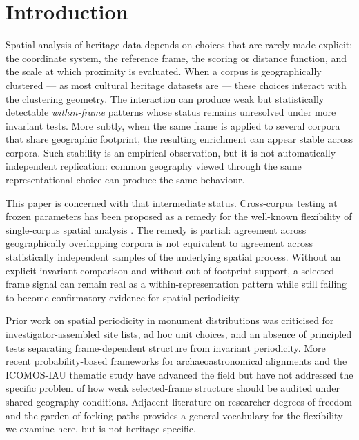 \documentclass[12pt,a4paper]{article}
\begin{document}
\section{Introduction}
\label{sec:introduction}

Spatial analysis of heritage data depends on choices that are rarely
made explicit: the coordinate system, the reference frame, the scoring
or distance function, and the scale at which proximity is evaluated.
When a corpus is geographically clustered --- as most cultural heritage
datasets are --- these choices interact with the clustering geometry.
The interaction can produce weak but statistically detectable
\emph{within-frame} patterns whose status remains unresolved under
more invariant tests. More subtly, when the same frame is applied to
several corpora that share geographic footprint, the resulting
enrichment can appear stable across corpora. Such stability is an
empirical observation, but it is not automatically independent
replication: common geography viewed through the same representational
choice can produce the same behaviour.

This paper is concerned with that intermediate status. Cross-corpus
testing at frozen parameters has been proposed as a remedy for the
well-known flexibility of single-corpus spatial analysis
\citep{thom1967,kendall1974,freeman1976}. The remedy is partial:
agreement across geographically overlapping corpora is not equivalent
to agreement across statistically independent samples of the underlying
spatial process. Without an explicit invariant comparison and without
out-of-footprint support, a selected-frame signal can remain real as a
within-representation pattern while still failing to become
confirmatory evidence for spatial periodicity.

Prior work on spatial periodicity in monument distributions
\citep{thom1967,kendall1974,freeman1976} was criticised for
investigator-assembled site lists, ad hoc unit choices, and an absence
of principled tests separating frame-dependent structure from
invariant periodicity. More recent probability-based frameworks for
archaeoastronomical alignments
\citep{magli2013,magli2016,ruggles1999astronomy,
ruggles2015handbook,silva2020statistical} and the ICOMOS-IAU thematic
study \citep{ruggles2010icomos} have advanced the field but have not
addressed the specific problem of how weak selected-frame structure
should be audited under shared-geography conditions. Adjacent
literature on researcher degrees of freedom and the garden of forking
paths \citep{gelmanloken2014} provides a general vocabulary for the
flexibility we examine here, but is not heritage-specific.
\end{document}
